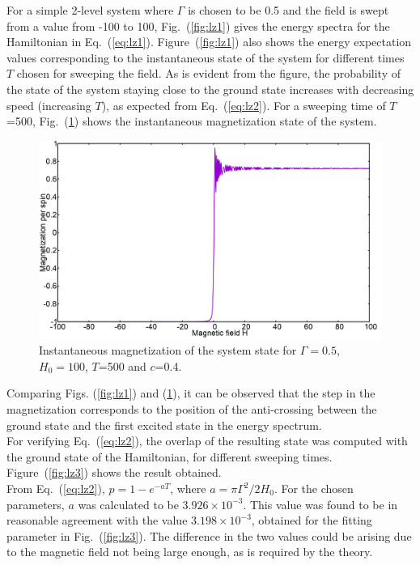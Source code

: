 \documentclass[../main.tex]{subfiles}
\begin{document}
For a simple 2-level system where $\Gamma$ is chosen to be 0.5 and the field is swept from a value from -100 to 100, Fig.~(\ref{fig:lz1}) gives the energy spectra for the Hamiltonian in Eq.~(\ref{eq:lz1}).
Figure~(\ref{fig:lz1}) also shows the energy expectation values corresponding to the instantaneous state of the system for different times $T$ chosen for sweeping the field. As is evident from the figure, the probability of the state of the system staying close to the ground state increases with decreasing speed (increasing $T$), as expected from Eq.~(\ref{eq:lz2}). For a sweeping time of $T$=500, Fig.~(\ref{fig:lz2}) shows the instantaneous magnetization state of the system.
\begin{figure}[H]
\centering 
\includegraphics[scale=0.24]{Magnetization_500.png}
\caption{Instantaneous magnetization of the system state for $\Gamma=0.5$, $H_0=100$, $T$=500 and $c$=0.4.}
\label{fig:lz2}
\end{figure}
Comparing Figs. (\ref{fig:lz1}) and (\ref{fig:lz2}), it can be observed that the step in the magnetization corresponds to the position of the anti-crossing between the ground state and the first excited state in the energy spectrum.\\

For verifying Eq.~(\ref{eq:lz2}), the overlap of the resulting state was computed with the ground state of the Hamiltonian, for different sweeping times. Figure~(\ref{fig:lz3}) shows the result obtained.\\

From Eq.~(\ref{eq:lz2}), $p=1-e^{-aT}$, where $a={\pi \Gamma^2/2H_0}$. For the chosen parameters, $a$ was calculated to be $3.926 \times 10^{-3}$. This value was found to be in reasonable agreement with the value $3.198 \times 10^{-3}$, obtained for the fitting parameter in Fig.~(\ref{fig:lz3}). The difference in the two values could be arising due to the magnetic field not being large enough, as is required by the theory.
\end{document}
